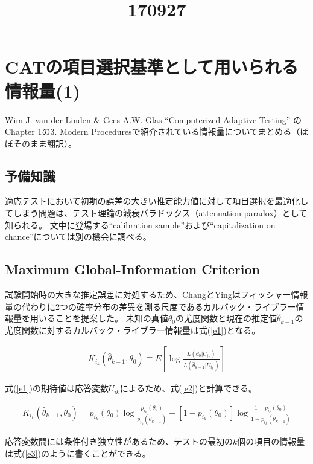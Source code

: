 \documentclass[a4j]{jarticle}
\date{}
\title{170927}
\begin{document}
\maketitle

\section{CATの項目選択基準として用いられる情報量(1)}
Wim J. van der Linden \& Cees A.W. Glas ``Computerized Adaptive Testing'' \cite{b1}のChapter 1の3. Modern Proceduresで紹介されている情報量についてまとめる（ほぼそのまま翻訳）。

\subsection{予備知識}
適応テストにおいて初期の誤差の大きい推定能力値に対して項目選択を最適化してしまう問題は、テスト理論の減衰パラドックス（attenuation paradox）として知られる。
文中に登場する``calibration sample''および``capitalization on chance''については別の機会に調べる。

\subsection{Maximum Global-Information Criterion}
試験開始時の大きな推定誤差に対処するため、ChangとYingはフィッシャー情報量の代わりに2つの確率分布の差異を測る尺度であるカルバック・ライブラー情報量を用いることを提案した。
未知の真値$\theta_{0}$の尤度関数と現在の推定値$\hat{\theta}_{k-1}$の尤度関数に対するカルバック・ライブラー情報量は式(\ref{e1})となる。

\begin{eqnarray}
  \label{e1}
  K_{i_{k}}(\hat{\theta}_{k-1},\theta_{0}) \equiv E[\log\frac{L(\theta_{0}|U_{i_{k}})}{L(\hat{\theta}_{k-1}|U_{i_{k}})}]
\end{eqnarray}

式(\ref{e1})の期待値は応答変数$U_{ik}$によるため、式(\ref{e2})と計算できる。

\begin{eqnarray}
  \label{e2}
  K_{i_{k}}(\hat{\theta}_{k-1},\theta_{0}) = p_{i_{k}}(\theta_{0})\log\frac{p_{i_{k}}(\theta_{0})}{p_{i_{k}}(\hat{\theta}_{k-1})} + [1-p_{i_{k}}(\theta_{0})]\log\frac{1-p_{i_{k}}(\theta_{0})}{1-p_{i_{k}}(\hat{\theta}_{k-1})}
\end{eqnarray}

応答変数間には条件付き独立性があるため、テストの最初の$k$個の項目の情報量は式(\ref{e3})のように書くことができる。
\end{document}
